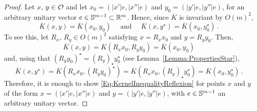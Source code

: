\begin{proof}
Let $x$, $y \in \mathcal{O}$ and let $x_0 = (|x'|e, |x''|e)$ and $y_0 = (|y'|e, |y''|e)$, for an
arbitrary unitary vector $e \in \mathbb{S}^{m-1} \subset \mathbb{R}^m$. Hence, since $\overline{K}$ is invariant
by $O(m)^2$,
$$
\overline{K}(x,y) = \overline{K}(x_0, y_0) \quad \text{ and } \quad \overline{K}(x,y^\star) = \overline{K}(x_0, y_0^\star)\,.
$$
To see this, let $R_x$, $R_y \in O(m)^2$ satisfying $x = R_x x_0$ and $y = R_y y_0$. Then,
$$
\overline{K}(x,y) = \overline{K}(R_x x_0,R_y y_0)  = \overline{K}(x_0, y_0)
$$
and, using that $(R_y y_0)^\star = (R_y)_\star y_0^\star$ (see Lemma~\ref{Lemma:PropertiesStar}),
$$
\overline{K}(x,y^\star) = \overline{K}(R_x x_0,(R_y y_0)^\star) = \overline{K}(R_x x_0,(R_y)_\star y_0^\star)  = \overline{K}(x_0, y_0^\star)\,.
$$
Therefore, it is enough to show \eqref{Eq:KernelInequalityReflexion} for points $x$ and $y$ of the
form $x = (|x'|e, |x''|e)$ and $y = (|y'|e, |y''|e)$, with $e \in \mathbb{S}^{m-1}$ an arbitrary unitary
vector.


\end{proof}
